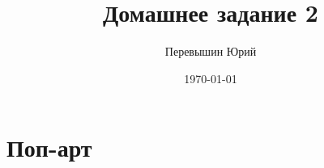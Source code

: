 \documentclass[12pt, a4paper]{article}
\author{Перевышин Юрий}
\title{Домашнее задание 2}
\date{\today}
\begin{document}
 

\maketitle

\section{Поп-арт}




\begin{figure}[H]
	\begin{minipage}[h]{0.32\linewidth}
		 \\
	\end{minipage}
	\hfill
	\begin{minipage}[h]{0.32\linewidth}
		 \\
	\end{minipage}
\hfill
\begin{minipage}[h]{0.32\linewidth}
	 \\
\end{minipage}


\end{figure}
\end{document}
